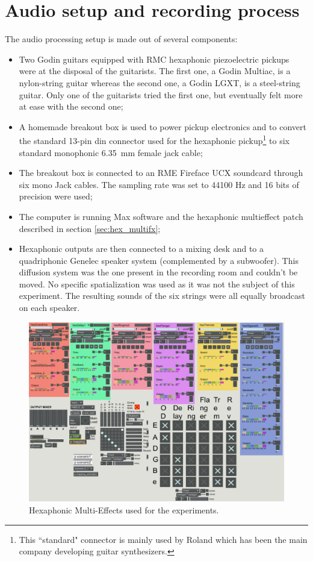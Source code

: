 \documentclass{article}
\begin{document}
\section{Audio setup and recording process}\label{sec:setup}
The audio processing setup is made out of several components: 
\begin{itemize}
    \item Two Godin guitars equipped with RMC hexaphonic piezoelectric pickups were at the disposal of the guitarists. 
    The first one, a Godin Multiac, is a nylon-string guitar whereas the second one, a Godin LGXT, is a steel-string 
    guitar. Only one of the guitarists tried the first one, but eventually felt more at ease with the second one;
    \item A homemade breakout box is used to power pickup electronics and to convert the standard 13-pin din connector 
    used for the hexaphonic pickup\footnote{This ``standard" connector is mainly used by Roland which has been the main company developing guitar synthesizers.} to six standard monophonic 6.35~mm female jack cable;
    \item The breakout box is connected to an RME Fireface UCX soundcard through six mono Jack cables. The sampling rate was 
    set to 44100 Hz and 16 bits of precision were used;
	\item The computer is running Max software and the hexaphonic multieffect patch described in section \ref{sec:hex_multifx};
    \item Hexaphonic outputs are then connected to a mixing desk and to a quadriphonic Genelec speaker system (complemented by a
    subwoofer). This diffusion system was the one present in the recording room and couldn't be moved. No specific
    spatialization was used as it was not the subject of this experiment. The resulting sounds of the six strings were all equally broadcast on each speaker.
    
\end{itemize}

\begin{figure}
    \centering
    \includegraphics[width=\columnwidth]{figures/191025-Patch-experience.png}
    \caption{Hexaphonic Multi-Effects used for the experiments.}
    \label{fig:hex-multieffect}
\end{figure}
\end{document}
